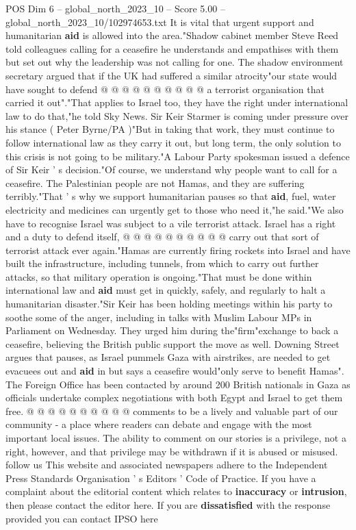 \begin{textsample}{POS Dim 6 – global\_north\_2023\_10 – Score 5.00 – global\_north\_2023\_10/102974653.txt}
It is vital that urgent support and humanitarian \textbf{aid} is allowed into the area."Shadow cabinet member Steve Reed told colleagues calling for a ceasefire he understands and empathises with them but set out why the leadership was not calling for one.
The shadow environment secretary argued that if the UK had suffered a similar atrocity"our state would have sought to defend @ @ @ @ @ @ @ @ @ @ a terrorist organisation that carried it out"."That applies to Israel too, they have the right under international law to do that,"he told Sky News.
Sir Keir Starmer is coming under pressure over his stance ( Peter Byrne/PA )"But in taking that work, they must continue to follow international law as they carry it out, but long term, the only solution to this crisis is not going to be military."A Labour Party spokesman issued a defence of Sir Keir ' s decision."Of course, we understand why people want to call for a ceasefire.
The Palestinian people are not Hamas, and they are suffering terribly."That ' s why we support humanitarian pauses so that \textbf{aid}, fuel, water electricity and medicines can urgently get to those who need it,"he said."We also have to recognise Israel was subject to a vile terrorist attack.
Israel has a right and a duty to defend itself, @ @ @ @ @ @ @ @ @ @ carry out that sort of terrorist attack ever again."Hamas are currently firing rockets into Israel and have built the infrastructure, including tunnels, from which to carry out further attacks, so that military operation is ongoing."That must be done within international law and \textbf{aid} must get in quickly, safely, and regularly to halt a humanitarian disaster."Sir Keir has been holding meetings within his party to soothe some of the anger, including in talks with Muslim Labour MPs in Parliament on Wednesday.
They urged him during the"firm"exchange to back a ceasefire, believing the British public support the move as well.
Downing Street argues that pauses, as Israel pummels Gaza with airstrikes, are needed to get evacuees out and \textbf{aid} in but says a ceasefire would"only serve to benefit Hamas".
The Foreign Office has been contacted by around 200 British nationals in Gaza as officials undertake complex negotiations with both Egypt and Israel to get them free. @ @ @ @ @ @ @ @ @ @ comments to be a lively and valuable part of our community - a place where readers can debate and engage with the most important local issues.
The ability to comment on our stories is a privilege, not a right, however, and that privilege may be withdrawn if it is abused or misused. follow us This website and associated newspapers adhere to the Independent Press Standards Organisation ' s Editors ' Code of Practice.
If you have a complaint about the editorial content which relates to \textbf{inaccuracy} or \textbf{intrusion}, then please contact the editor here.
If you are \textbf{dissatisfied} with the response provided you can contact IPSO here

\end{textsample}
